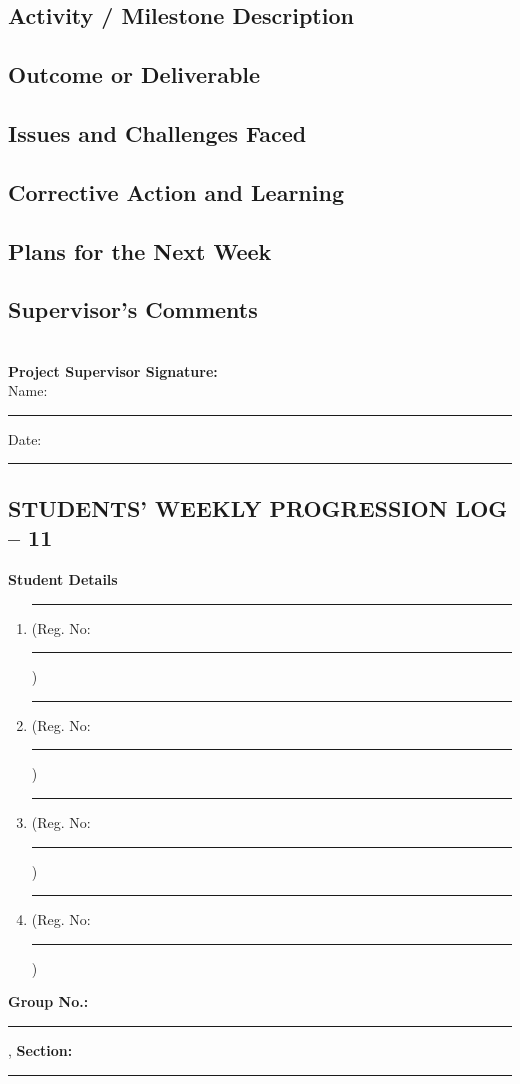 \documentclass[a4paper]{article}
\begin{document}
				 

\subsection*{Activity / Milestone Description}
\framebox[\textwidth][c]{\rule{0pt}{4cm}}

\subsection*{Outcome or Deliverable}
\framebox[\textwidth][c]{\rule{0pt}{4cm}}


\subsection*{Issues and Challenges Faced}
\framebox[\textwidth][c]{\rule{0pt}{4cm}}


\subsection*{Corrective Action and Learning}
\framebox[\textwidth][c]{\rule{0pt}{4cm}}


\subsection*{Plans for the Next Week}
\framebox[\textwidth][c]{\rule{0pt}{4cm}}

\subsection*{Supervisor's Comments}
\framebox[\textwidth][c]{\rule{0pt}{4cm}}\\[2em]

\vfill
\textbf{Project Supervisor Signature:}\\[1em]
Name: \rule{6cm}{0.4pt} \hfill Date: \rule{4cm}{0.4pt}


\newpage
\begin{center}
\section*{STUDENTS' WEEKLY PROGRESSION LOG -- 11}
\end{center}
{\Large\textbf{Student Details}}\\[0.1em]
\begin{enumerate}[itemsep=0em]
\item \rule{8cm}{0.4pt} (Reg. No:\rule{2cm}{0.4pt})
\item \rule{8cm}{0.4pt} (Reg. No:\rule{2cm}{0.4pt})
\item \rule{8cm}{0.4pt} (Reg. No:\rule{2cm}{0.4pt})
\item \rule{8cm}{0.4pt} (Reg. No:\rule{2cm}{0.4pt})
\end{enumerate}
\textbf{Group No.:} \rule{4cm}{0.4pt}, \textbf{Section:} \rule{3.5cm}{0.4pt}
\end{document}
